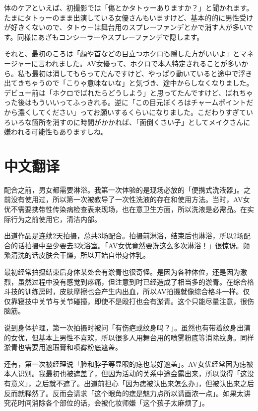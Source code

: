 \documentclass[12pt,UTF8]{ctexbook}
\begin{document}
体のケアといえば、初撮影では「傷とかタトゥーありますか？」と聞かれます。たまにタトゥーのまま出演している女優さんもいますけど、基本的的に男性受けが好きくないので、タトゥーは舞台用のスプレーファンデとかで消す人が多いです。同様にあざもコンシーラーやスプレーファンデで隠します。

それと、最初のころは「顔や首などの目立つホクロも隠した方がいいよ」とマネージャーに言われました。AV女優って、ホクロで本人特定されることが多いから。私も最初は消してもらってたんですけど、やっぱり動いていると途中で浮き出てきちゃうので「こりゃ意味ないな」と気づき、途中からしなくなりました。デビュー前は「ホクロでばれたらどうしよう」と思ってたんですけど、ばれちゃった後はもういいってふっきれる。逆に「この目元ぼくろはチャームポイントだから濃くしてください」ってお願いするくらいになりました。こだわりすぎていろいろな箇所を消すのに時間がかかれば、「面倒くさい子」としてメイクさんに嫌われる可能性もありますしね。

\switchcolumn

\section*{中文翻译}

配合之前，男女都需要淋浴。我第一次体验的是现场必放的「便携式洗液器」。之前没有使用过，所以第一次被教导了一次性洗液的存在和使用方法。当时，AV女优不需要携带性传染病检查表来现场，也在意卫生方面，所以洗液是必需品。在实际行为之前使用它，清洁内部。

出道作品是连续2天拍摄，总共3场配合。拍摄前淋浴，结束后也淋浴，所以2场配合的话拍摄中至少要去3次浴室。「AV女优竟然要洗这么多次淋浴！」很惊讶。频繁清洗的话皮肤会干燥，所以开始自带身体乳。

最初经常拍摄结束后身体某处会有淤青也很奇怪。是因为各种体位，还是因为激烈，虽然过程中没有感觉到疼痛，但注意到时已经造成了相当多的淤青。在综合格斗技的训练房时，皮肤摩擦也会产生内出血，所以AV拍摄就像综合格斗一样。仅仅靠寝技中关节与关节碰撞，即使不是殴打也会有淤青。这个只能尽量注意，很伤脑筋。

说到身体护理，第一次拍摄时被问「有伤疤或纹身吗？」。虽然也有带着纹身出演的女优，但基本上男性不喜欢，所以很多人用舞台用的喷雾粉底等消除纹身。同样淤青也需要用遮瑕膏和喷雾粉底遮盖。

还有，第一次被经理说「脸和脖子等显眼的痣也最好遮盖」。AV女优经常因为痣被本人识别。我最初也被遮盖了，但因为活动的关系中途会露出来，所以觉得「这没有意义」，之后就不遮了。出道前担心「因为痣被认出来怎么办」，但被认出来之后反而就释然了。反而会请求「这个眼角的痣是魅力点所以请画浓一点」。如果太讲究花时间消除各个部位的话，会被化妆师嫌「这个孩子太麻烦了」。
\end{document}
